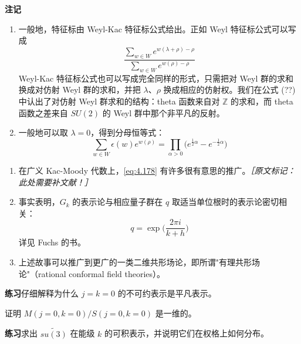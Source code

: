 \textbf{注记}

\begin{enumerate}
  \item 一般地，特征标由 Weyl-Kac 特征标公式给出。正如 Weyl 特征标公式可以写成
  \begin{equation}
    \frac{\sum_{w\in W}e^{w(\lambda+\rho)-\rho}}{\sum_{w\in W}e^{w(\rho)-\rho}}
    \tag{4.177}
    \label{eq:4.177}
  \end{equation}
  Weyl-Kac 特征标公式也可以写成完全同样的形式，只需把对 Weyl 群的求和换成对仿射 Weyl 群的求和，并把 $\lambda$、$\rho$ 换成相应的仿射权。我们在公式 (??) 中认出了对仿射 Weyl 群求和的结构：theta 函数来自对 $\mathbb{Z}$ 的求和，而 theta 函数之差来自 $SU(2)$ 的 Weyl 群中那个非平凡的反射。
  \item 一般地可以取 $\lambda=0$，得到分母恒等式：
  \begin{equation}
    \sum_{w\in W}\epsilon(w)e^{w(\rho)}=\prod_{\alpha>0}\big(e^{\frac12\alpha}-e^{-\frac12\alpha}\big)
    \tag{4.178}
    \label{eq:4.178}
  \end{equation}
\end{enumerate}


\begin{enumerate}[start=3]
  \item 在广义 Kac-Moody 代数上，\eqref{eq:4.178} 有许多很有意思的推广。{\small\itshape ［原文标记：此处需要补文献！］}
  \item 事实表明，$G_k$ 的表示论与相应量子群在 $q$ 取适当单位根时的表示论密切相关：
  \begin{equation}
    q=\exp\Big(\frac{2\pi i}{k+h}\Big)
    \tag{4.179}
    \label{eq:4.179}
  \end{equation}
  详见 Fuchs 的书。
  \item 上述故事可以推广到更广的一类二维共形场论，即所谓"有理共形场论"（rational conformal field theories）。
\end{enumerate}

\medskip\noindent\textbf{练习}\quad 仔细解释为什么 $j=k=0$ 的不可约表示是平凡表示。

\noindent 证明 $M(j=0,k=0)/S(j=0,k=0)$ 是一维的。

\medskip\noindent\textbf{练习}\quad 求出 $\widetilde{su(3)}$ 在能级 $k$ 的可积表示，并说明它们在权格上如何分布。


